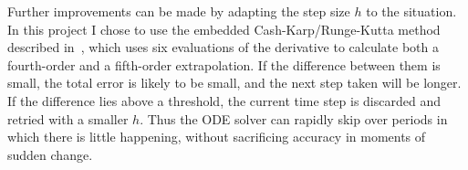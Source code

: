 Further improvements can be made by adapting the step size $h$ to the situation. In this project
I chose to use the embedded Cash-Karp/Runge-Kutta method described in~\cite{NRinC}, which uses
six evaluations of the derivative to calculate both a fourth-order and a fifth-order
extrapolation. If the difference between them is small, the total error is likely to be small,
and the next step taken will be longer. If the difference lies above a threshold, the current
time step is discarded and retried with a smaller $h$. Thus the ODE solver can rapidly skip over
periods in which there is little happening, without sacrificing accuracy in moments of sudden
change.
